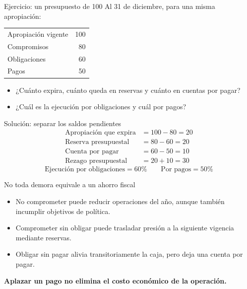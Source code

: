\begin{frame}{Ejercicio: un presupuesto de 100}
Al 31 de diciembre, para una misma apropiación:
\begin{center}
\begin{tabular}{lr}
\toprule
Apropiación vigente & 100\\
Compromisos & 80\\
Obligaciones & 60\\
Pagos & 50\\
\bottomrule
\end{tabular}
\end{center}
\begin{itemize}
  \item ¿Cuánto expira, cuánto queda en reservas y cuánto en cuentas por pagar?
  \item ¿Cuál es la ejecución por obligaciones y cuál por pagos?
\end{itemize}
\end{frame}

\begin{frame}{Solución: separar los saldos pendientes}
\begin{align*}
  \text{Apropiación que expira}&=100-80=20\\
  \text{Reserva presupuestal}&=80-60=20\\
  \text{Cuenta por pagar}&=60-50=10\\
  \text{Rezago presupuestal}&=20+10=30
\end{align*}
\[\text{Ejecución por obligaciones}=60\%\qquad\text{Por pagos}=50\%\]
\end{frame}

\begin{frame}{No toda demora equivale a un ahorro fiscal}
\begin{itemize}
  \item No comprometer puede reducir operaciones del año, aunque también incumplir objetivos de política.
  \item Comprometer sin obligar puede trasladar presión a la siguiente vigencia mediante reservas.
  \item Obligar sin pagar alivia transitoriamente la caja, pero deja una cuenta por pagar.
\end{itemize}
\vspace{0.7em}
\textbf{Aplazar un pago no elimina el costo económico de la operación.}
\fuenteCaja
\end{frame}

